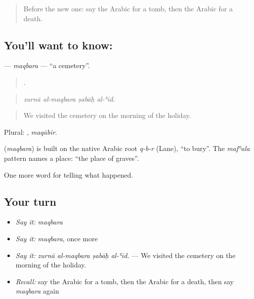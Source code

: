 \label{lesson:AR-C338-maqbara}



\begin{quote}
Before the new one: say the Arabic for a tomb, then the Arabic for a death.
\end{quote}

\subsection*{You'll want to know: }
\textbf{} — \emph{maqbara} — \textquotedblleft{}a cemetery\textquotedblright{}.

\begin{quote}
   .
\end{quote}

\begin{quote}
\emph{zurnā al-maqbara ṣabāḥ al-ʿīd.}
\end{quote}

\begin{quote}
We visited the cemetery on the morning of the holiday.
\end{quote}

Plural: , \emph{maqābir}.

\begin{cousinweb}
\textbf{} (\emph{maqbara}) is built on the native Arabic root \emph{q-b-r} (Lane), \textquotedblleft{}to bury\textquotedblright{}. The \emph{mafʿala} pattern names a place: \textquotedblleft{}the place of graves\textquotedblright{}.
\end{cousinweb}

\begin{grammarlens}[title={What you've built}]
One more word for telling what happened.
\end{grammarlens}

\subsection*{Your turn}
\begin{itemize}
\raggedright
  \item \emph{Say it:} \emph{maqbara}
  \item \emph{Say it:} \emph{maqbara}, once more
  \item \emph{Say it:} \emph{zurnā al-maqbara ṣabāḥ al-ʿīd.} — We visited the cemetery on the morning of the holiday.
  \item \emph{Recall:} say the Arabic for a tomb, then the Arabic for a death, then say \emph{maqbara} again
\end{itemize}

